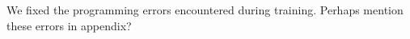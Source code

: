 We fixed the programming errors encountered during training. Perhaps mention these errors in appendix?
